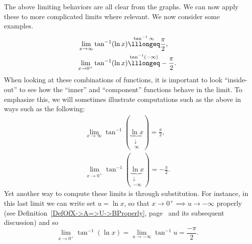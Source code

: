 
The above limiting behaviors are all clear from the graphs.
We can now apply these to more complicated limits where relevant.
We now consider some examples.
\begin{align*}
\lim_{x\to\infty}\tan^{-1}(\ln x)&\overset{\tan^{-1}\infty}{\lllongeq}
                                  \frac{\pi}2,\\
\lim_{x\to0^+}\tan^{-1}(\ln x)&\overset{\tan^{-1}(-\infty)}{\lllongeq}
                                   -\frac{\pi}2.
\end{align*}
When looking at these combinations of functions, it is important
to look ``inside-out'' to see how the ``inner'' and ``component''
functions behave in the limit.  To emphasize this, we will sometimes
illustrate computations such as the above in ways such as the
following:
\begin{align*}
\lim_{x\to\infty}\tan^{-1}(\underbrace{\ln x}_{\begin{array}{cc}
     \downarrow\\ \infty\end{array}})=\frac{\pi}2,\\
\lim_{x\to0^+}\tan^{-1}(\underbrace{\ln x}_{\begin{array}{cc}
     \downarrow\\ -\infty\end{array}})=-\frac{\pi}2.
\end{align*}
Yet another way to compute these limits is through substitution.
For instance, in this last limit we can write set 
$u=\ln x$, so that $x\to0^+\implies u\to-\infty$ properly
(see Definition~\ref{DefOfX->A=>U->BProperly}, 
page~\pageref{DefOfX->A=>U->BProperly} and its subsequent discussion) and 
so 
$$
\lim_{x\to0^+}\tan^{-1}(\ln x)=\lim_{u\to-\infty}\tan^{-1}u=\frac{-\pi}{2}.$$

